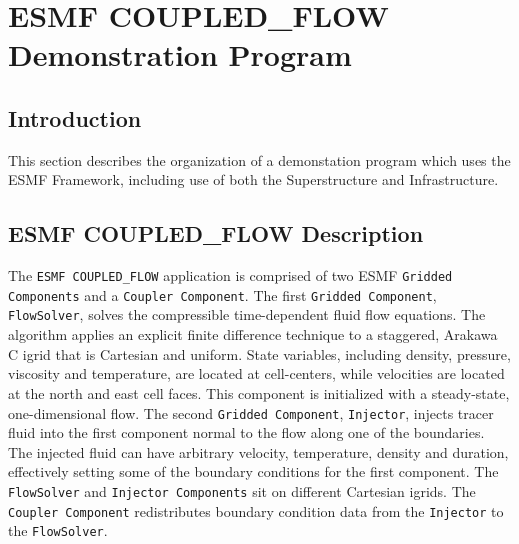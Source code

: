 
\section{ESMF COUPLED\_FLOW Demonstration Program}
\label{sec:demo}

\subsection{Introduction}

This section describes the organization of a
demonstation program which uses the ESMF Framework,
including use of both the 
Superstructure and Infrastructure.

\subsection{ESMF COUPLED\_FLOW Description}
 
The {\tt ESMF COUPLED\_FLOW} application is comprised of two ESMF 
{\tt Gridded Components} and a {\tt Coupler Component}.  
The first {\tt Gridded Component}, {\tt FlowSolver}, solves the compressible 
time-dependent fluid flow equations.  The algorithm 
applies an explicit finite difference technique to a staggered, Arakawa C igrid 
that is Cartesian and uniform.  State variables, including density, 
pressure, viscosity and temperature, are located at cell-centers, while 
velocities are located at the north and east cell faces.  This component is initialized 
with a steady-state, one-dimensional flow.  The second {\tt Gridded 
Component}, {\tt Injector}, injects tracer fluid into the first component normal to the 
flow along 
one of the boundaries.  The injected fluid can have arbitrary velocity, 
temperature, density and duration, effectively setting some of 
the boundary conditions for the first component.  The {\tt FlowSolver} and 
{\tt Injector Components} sit on different Cartesian igrids.  The
{\tt Coupler Component} redistributes boundary condition data from 
the {\tt Injector} to the {\tt FlowSolver}.


